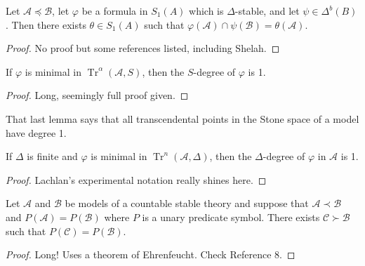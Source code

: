 \documentclass{article}
\DeclareMathOperator{\Tr}{Tr}
\let\mc\mathcal
\begin{document}
\begin{lemma}
    Let $\mc{A} \preceq \mc{B}$, let $\varphi$ be a formula in $S_1(A)$ which is $\Delta$-stable, and let $\psi \in \Delta^b(B)$. Then there exists $\theta \in S_1(A)$ such that $\varphi(\mc{A}) \cap \psi(\mc{B}) = \theta(\mc{A})$.
\end{lemma}
\begin{proof}
    No proof but some references listed, including Shelah.
\end{proof}

\begin{lemma}
    If $\varphi$ is minimal in $\Tr^{\alpha}(\mc{A}, S)$, then the $S$-degree of $\varphi$ is 1.
\end{lemma}
\begin{proof}
    Long, seemingly full proof given.
\end{proof}
That last lemma says that all transcendental points in the Stone space of a model have degree 1.

\begin{lemma}
    If $\Delta$ is finite and $\varphi$ is minimal in $\Tr^n(\mc{A}, \Delta)$, then the $\Delta$-degree of $\varphi$ in $\mc{A}$ is 1.
\end{lemma}
\begin{proof}
    Lachlan's experimental notation really shines here.
\end{proof}

\begin{theorem}
    Let $\mc{A}$ and $\mc{B}$ be models of a countable stable theory and suppose that $\mc{A} \prec \mc{B}$ and $P(\mc{A}) = P(\mc{B})$ where $P$ is a unary predicate symbol. There exists $\mc{C} \succ \mc{B}$ such that $P(\mc{C}) = P(\mc{B})$.
\end{theorem}
\begin{proof}
    Long! Uses a theorem of Ehrenfeucht. Check Reference 8.
\end{proof}
\end{document}
